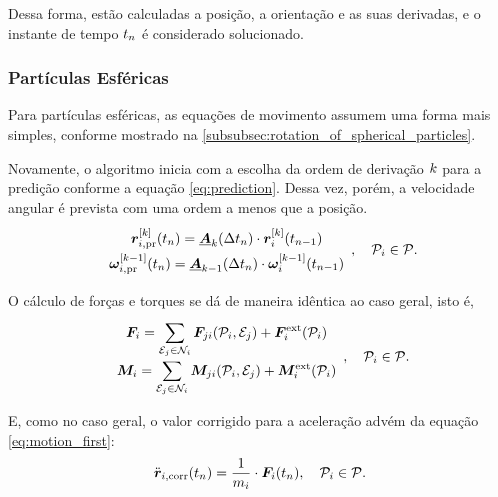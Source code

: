 Dessa forma, estão calculadas a posição, a orientação e as suas derivadas, e o instante de tempo \(\instant[n]\) é considerado solucionado.

\subsubsection*{Partículas Esféricas}

Para partículas esféricas, as equações de movimento assumem uma forma mais simples, conforme mostrado na \autoref{subsubsec:rotation_of_spherical_particles}. 

Novamente, o algoritmo inicia com a escolha da ordem de derivação \(k\) para a predição conforme a equação \eqref{eq:prediction}. Dessa vez, porém, a velocidade angular é prevista com uma ordem a menos que a posição.
\begin{equation*}
	\def\arraystretch{1.5}
	\begin{array}{c}
		\drvec{\taylorOrder}{\positionipr}\pqty{\instant[n]} = \extrapolationMatrix{\taylorOrder}[\Dt[n]]\cdot\drvec{\taylorOrder}{\positioni}\pqty{\instant[n-1]} \\
		\drvec{\taylorOrder-1}{\angularVelocityipr}\pqty{\instant[n]} = \extrapolationMatrix{\taylorOrder-1}[\Dt[n]]\cdot\drvec{\taylorOrder-1}{\angularVelocityi}\pqty{\instant[n-1]} \\
	\end{array}, \quad \particlei\in\particleSet.
\end{equation*}

O cálculo de forças e torques se dá de maneira idêntica ao caso geral, isto é,
\begin{equation*}
	\def\arraystretch{1.5}
	\begin{array}{c}
		\resultingForcei = \dsum_{\elementj\in\neighborhoodi}\forceji\pqty{\particlei, \elementj} + \external\forcei\pqty{\particlei}\\
		\resultingTorquei = \dsum_{\elementj\in\neighborhoodi}\torqueji\pqty{\particlei, \elementj} + \external\torquei\pqty{\particlei}
	\end{array}, \quad \particlei\in\particleSet.
\end{equation*}

E, como no caso geral, o valor corrigido para a aceleração advém da equação \eqref{eq:motion_first}:
\begin{equation*}
	\accelerationicorr\pqty{\instant[n]} = \dfrac{1}{\massi}\cdot\resultingForcei\pqty{\instant[n]}, \quad\particlei\in\particleSet.
\end{equation*}

